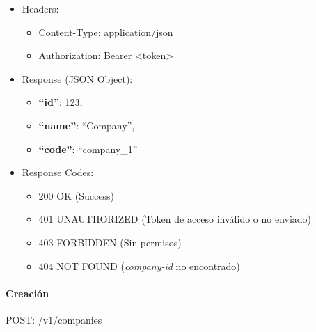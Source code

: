 \documentclass[12pt,a4paperpaper,]{report}
\providecommand{\tightlist}{%
  \setlength{\itemsep}{0pt}\setlength{\parskip}{0pt}}
\let\oldparagraph\paragraph
\renewcommand{\paragraph}[1]{\oldparagraph{#1}\mbox{}}
\begin{document}
\begin{itemize}
\tightlist
\item
  Headers:

  \begin{itemize}
  \tightlist
  \item
    Content-Type: application/json
  \item
    Authorization: Bearer \textless{}token\textgreater{}
  \end{itemize}
\item
  Response (JSON Object):

  \begin{itemize}
  \tightlist
  \item
    \textbf{``id''}: 123,
  \item
    \textbf{``name''}: ``Company'',
  \item
    \textbf{``code''}: ``company\_1''
  \end{itemize}
\item
  Response Codes:

  \begin{itemize}
  \tightlist
  \item
    200 OK (Success)
  \item
    401 UNAUTHORIZED (Token de acceso inválido o no enviado)
  \item
    403 FORBIDDEN (Sin permisos)
  \item
    404 NOT FOUND (\emph{company-id} no encontrado)
  \end{itemize}
\end{itemize}

\paragraph{Creación}\label{creaciuxf3n}

POST: /v1/companies
\end{document}
